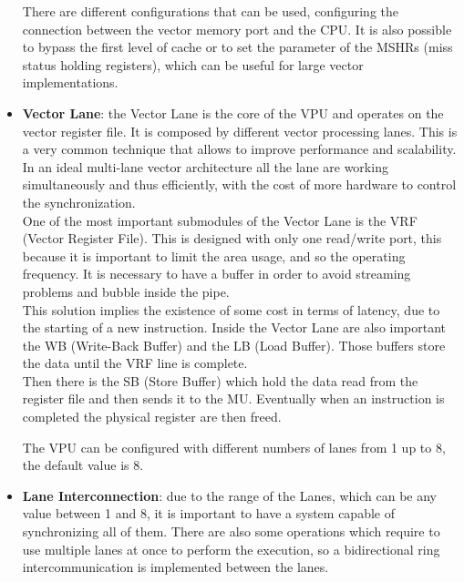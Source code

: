 \begin{itemize}
    There are different configurations that can be used, configuring the connection between the vector memory port and the CPU.
    It is also possible to bypass the first level of cache or to set the parameter of the MSHRs (miss status holding registers), which can be useful for large vector implementations.

    
    \item \textbf{Vector Lane}: the Vector Lane is the core of the VPU and operates on the vector register file. It is composed by different vector processing lanes. This is a very common technique that allows to improve performance and scalability.\\
    In an ideal multi-lane vector architecture all the lane are working simultaneously and thus efficiently, with the cost of more hardware to control the synchronization.\\
    
    One of the most important submodules of the Vector Lane is the VRF (Vector Register File). This is designed with only one read/write port, this because it is important to limit the area usage, and so the operating frequency. It is necessary to have a buffer in order to avoid streaming problems and bubble inside the pipe.\\
    
    This solution implies the existence of some cost in terms of latency, due to the starting of a new instruction.
    Inside the Vector Lane are also important the WB (Write-Back Buffer) and the LB (Load Buffer). Those buffers store the data until the VRF line is complete.\\
    Then there is the SB (Store Buffer) which hold the data read from the  register file and then sends it to the MU. 
    Eventually when an instruction is completed the physical register are then freed. 
    
    The VPU can be configured with different numbers of lanes from 1 up to 8, the default value is 8.\\
    
    \item \textbf{Lane Interconnection}: due to the range of the Lanes, which can be any value between 1 and 8, it is important to have a system capable of synchronizing all of them. There are also some operations which require to use multiple lanes at once to perform the execution, so a bidirectional ring intercommunication is implemented between the lanes.
\end{itemize}

